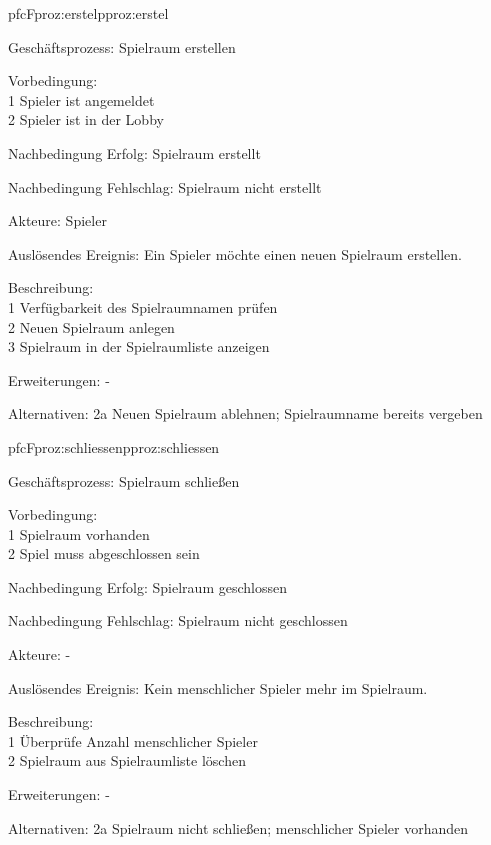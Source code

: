 \begin{description}[leftmargin=3em, style=sameline]
	\begin{php}{pfc}{F}{proz:erstel}{pproz:erstel}
		\item [Geschäftsprozess:] Spielraum erstellen
		\item [Vorbedingung:]\hfill\\
		1 Spieler ist angemeldet \\
		2 Spieler ist in der Lobby
		\item [Nachbedingung Erfolg:] Spielraum erstellt
		\item [Nachbedingung Fehlschlag:] Spielraum nicht erstellt
		\item [Akteure:] Spieler
		\item [Auslösendes Ereignis:] Ein Spieler möchte einen neuen Spielraum erstellen.
		\item [Beschreibung:]\hfill\\
		1 Verfügbarkeit des Spielraumnamen prüfen \\
		2 Neuen Spielraum anlegen \\
		3 Spielraum in der Spielraumliste anzeigen
		\item [Erweiterungen:] -
		\item [Alternativen:] 2a Neuen Spielraum ablehnen; Spielraumname bereits vergeben
	\end{php}
	
	\begin{php}{pfc}{F}{proz:schliessen}{pproz:schliessen}
		\item [Geschäftsprozess:] Spielraum schließen
		\item [Vorbedingung:]\hfill\\
		1 Spielraum vorhanden \\
		2 Spiel muss abgeschlossen sein
		\item [Nachbedingung Erfolg:] Spielraum geschlossen
		\item [Nachbedingung Fehlschlag:] Spielraum nicht geschlossen
		\item [Akteure:] -
		\item [Auslösendes Ereignis:] Kein menschlicher Spieler mehr im Spielraum. 
		\item [Beschreibung:] \hfill\\
		1 Überprüfe Anzahl menschlicher Spieler \\
		2 Spielraum aus Spielraumliste löschen
		\item [Erweiterungen:] -
		\item [Alternativen:] 2a Spielraum nicht schließen; menschlicher Spieler vorhanden 
	\end{php}
	

\end{description}
